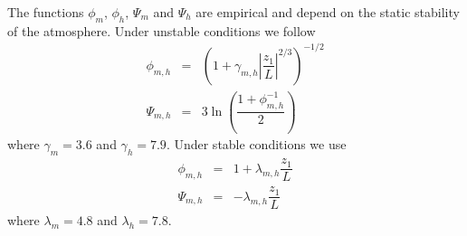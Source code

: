 \documentclass[gmd]{copernicus}
\begin{document}
The functions $\phi_m$, $\phi_h$, $\varPsi_m$ and $\varPsi_h$ are empirical and depend on the static stability of the atmosphere. Under unstable conditions we follow \citet{Wilson2001, Wyngaard2010} 
\begin{eqnarray}
\phi_{m,h} & = & \left( 1 + \gamma_{m,h} \left| \dfrac{z_1}{L} \right|^{2/3} \right)^{-1/2}\\
\varPsi_{m,h} & = & 3 \ln{\left( \dfrac{1 + \phi_{m,h}^{-1}}{2} \right)} 
\end{eqnarray}
where $\gamma_m = 3.6$ and $\gamma_h = 7.9$. Under stable conditions we use \citet{Hogstrom1988, Wyngaard2010}
\begin{eqnarray}
\phi_{m,h} & = & 1 + \lambda_{m,h} \dfrac{z_1}{L}\\
\varPsi_{m,h} & = & - \lambda_{m,h} \dfrac{z_1}{L}
\end{eqnarray}
where $\lambda_m = 4.8$ and $\lambda_h = 7.8$.
\end{document}
